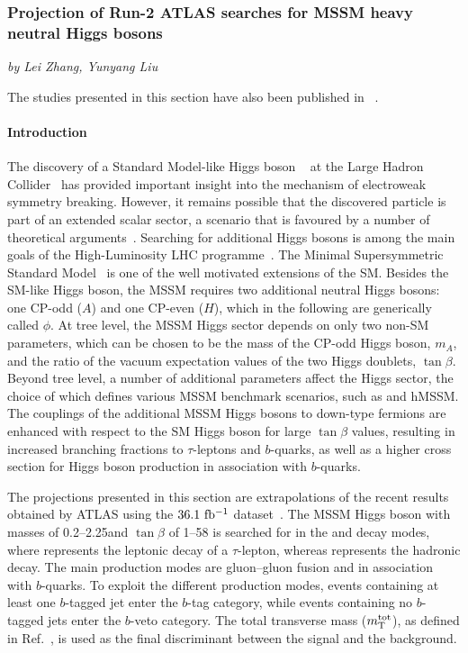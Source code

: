 \subsubsection{Projection of Run-2 ATLAS searches for MSSM heavy neutral Higgs bosons}
\begin{center}
{\it{ by Lei Zhang, Yunyang Liu}}
\end{center}
The studies presented in this section have also been published in ~\cite{ATL-PHYS-PUB-2018-050}.

\paragraph{Introduction}

The discovery of a Standard Model-like Higgs boson ~\cite{ATLASHiggsJuly2012, CMSHiggsJuly2012}
at the Large Hadron Collider~\cite{LHC} has provided important insight into the mechanism of
electroweak symmetry breaking. However, it remains possible that the discovered particle is part
of an extended scalar sector, a scenario that is favoured by a number of theoretical arguments~\cite{Djouadi:2005gj,Branco:2011iw}.
Searching for additional Higgs bosons is among the main goals of
the High-Luminosity LHC programme~\cite{ecfa15}. The Minimal Supersymmetric Standard
Model~\cite{Djouadi:2005gj,Fayet:1976et,Fayet:1977yc} is one of the well motivated extensions
of the SM\@. Besides the SM-like Higgs boson, the MSSM requires two additional neutral Higgs bosons:
one CP-odd ($A$) and one CP-even ($H$), which in the following are generically called $\phi$.
At tree level, the MSSM Higgs sector depends on only two non-SM parameters, which can be chosen
to be the mass of the CP-odd Higgs boson, $m_A$, and the ratio of the vacuum expectation values
of the two Higgs doublets, $\tan\beta$. Beyond tree level, a number of additional parameters
affect the Higgs sector, the choice of which defines various MSSM benchmark scenarios, such as \mhmodp and hMSSM.
The couplings of the additional MSSM Higgs bosons to down-type fermions are enhanced with respect to
the SM Higgs boson for large $\tan\beta$ values, resulting in increased branching fractions to
$\tau$-leptons and $b$-quarks, as well as a higher cross section for Higgs boson production
in association with $b$-quarks.

The projections presented in this section are extrapolations of the recent results obtained by ATLAS using
the $36.1~\mbox{fb$^{-1}$}$ \RunTwo dataset~\cite{ATLASRun2Ditau}.  The MSSM Higgs boson with masses of
0.2--2.25\TeV and $\tan\beta$ of 1--58 is searched for in the \lephad and \hadhad decay modes,
where \taulep represents the leptonic decay of a $\tau$-lepton, whereas \tauhad represents the hadronic decay.
The main production modes are gluon--gluon fusion and in association with $b$-quarks.
To exploit the different production modes, events containing at least one $b$-tagged jet enter the $b$-tag
category, while events containing no $b$-tagged jets enter the $b$-veto category. The total transverse
mass ($m_\textnormal{T}^\textnormal{tot}$), as defined in Ref.~\cite{ATLASRun2Ditau}, is used as the final discriminant between
the signal and the background.

